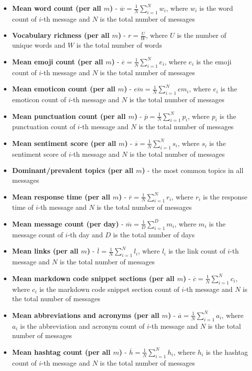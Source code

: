 \documentclass{article}
\begin{document}
\begin{itemize}
	\item \textbf{Mean word count (per all $m$)} - \(\overline{w} = \frac{1}{N} \sum_{i=1}^{N} w_i \), where $w_i$ is the word count of $i$-th message and $N$ is the total number of messages
	\item \textbf{Vocabulary richness (per all $m$)} - \(r = \frac{U}{W} \), where $U$ is the number of unique words and $W$ is the total number of words
	\item \textbf{Mean emoji count (per all $m$)} - \(\overline{e} = \frac{1}{N} \sum_{i=1}^{N} e_i \), where $e_i$ is the emoji count of $i$-th message and $N$ is the total number of messages
	\item \textbf{Mean emoticon count (per all $m$)} - \(\overline{em} = \frac{1}{N} \sum_{i=1}^{N} em_i \), where $e_i$ is the emoticon count of $i$-th message and $N$ is the total number of messages
	\item \textbf{Mean punctuation count (per all $m$)} - \(\overline{p} = \frac{1}{N} \sum_{i=1}^{N} p_i \), where $p_i$ is the punctuation count of $i$-th message and $N$ is the total number of messages
	\item \textbf{Mean sentiment score (per all $m$)} - \(\overline{s} = \frac{1}{N} \sum_{i=1}^{N} s_i \), where $s_i$ is the sentiment score of $i$-th message and $N$ is the total number of messages
	\item \textbf{Dominant/prevalent topics (per all $m$)} - the most common topics in all messages
	\item \textbf{Mean response time (per all $m$)} - \(\overline{r} = \frac{1}{N} \sum_{i=1}^{N} r_i \), where $r_i$ is the response time of $i$-th message and $N$ is the total number of messages
	\item \textbf{Mean message count (per day)} - \(\overline{m} = \frac{1}{D} \sum_{i=1}^{D} m_i \), where $m_i$ is the message count of $i$-th day and $D$ is the total number of days
	\item \textbf{Mean links (per all $m$)} - \(\overline{l} = \frac{1}{N} \sum_{i=1}^{N} l_i \), where $l_i$ is the link count of $i$-th message and $N$ is the total number of messages
	\item \textbf{Mean markdown code snippet sections (per all $m$)} - \(\overline{c} = \frac{1}{N} \sum_{i=1}^{N} c_i \), where $c_i$ is the markdown code snippet section count of $i$-th message and $N$ is the total number of messages
	\item \textbf{Mean abbreviations and acronyms (per all $m$)} - \(\overline{a} = \frac{1}{N} \sum_{i=1}^{N} a_i \), where $a_i$ is the abbreviation and acronym count of $i$-th message and $N$ is the total number of messages
	\item \textbf{Mean hashtag count (per all $m$)} - \(\overline{h} = \frac{1}{N} \sum_{i=1}^{N} h_i \), where $h_i$ is the hashtag count of $i$-th message and $N$ is the total number of messages
\end{itemize}
\end{document}
